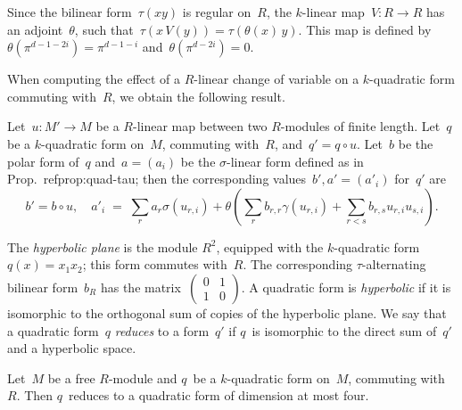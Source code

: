 \documentclass{article}%
\def\pa#1{\left(#1\right)}
\def\mat#1{\begin{pmatrix}#1\end{pmatrix}}
\begin{document}
Since the bilinear form~$τ(x y)$ is regular on~$R$, the $k$-linear
map~$V: R → R$ has an adjoint~$θ$, such that~$τ(x\, V(y)) = τ(θ(x)\, y)$.
This map is defined by~$θ(π^{d-1-2i}) = π^{d-1-i}$ and~$θ(π^{d-2i}) = 0$.

When computing the effect of a $R$-linear change of variable on a
$k$-quadratic form commuting with~$R$, we obtain the following result.

\begin{prop}\label{prop:quad-changevar}%
Let~$u: M' → M$ be a $R$-linear map between two $R$-modules of finite length.
Let~$q$ be a $k$-quadratic form on~$M$, commuting with~$R$, and~$q' = q ∘ u$.
Let~$b$ be the polar form of~$q$ and~$a = (a_i)$ be the $σ$-linear form defined
as in Prop.~ref{prop:quad-tau}; then the corresponding values~$b', a' =
(a'_i)$
for~$q'$ are
\begin{equation*}
b' = b ∘ u, \quad
a'_i \;=\; ∑_r a_r σ(u_{r,i})
  + θ \pa{ ∑_r b_{r,r} γ(u_{r,i}) + ∑_{r < s} b_{r,s} u_{r,i} u_{s,i} }.
\end{equation*}
\end{prop}%


The \emph{hyperbolic plane} is the module $R^2$, equipped with the
$k$-quadratic form~$q(x) = x_1 x_2$; this form commutes with~$R$. The
corresponding $τ$-alternating bilinear form~$b_R$ has the
matrix~$\mat{0&1\\1&0}$. A quadratic form is \emph{hyperbolic} if it is
isomorphic to the orthogonal sum of copies of the hyperbolic plane.
We say that a quadratic form~$q$ \emph{reduces} to a form~$q'$ if $q$~is
isomorphic to the direct sum of~$q'$ and a hyperbolic space.

\begin{prop}\label{prop:witt-four}
Let~$M$ be a free $R$-module and $q$~be a $k$-quadratic form on~$M$,
commuting with~$R$.
Then $q$~reduces to a quadratic form of dimension at most four.
\end{prop}
\end{document}
